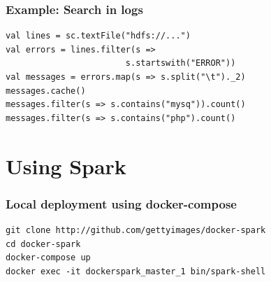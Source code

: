 \documentclass{beamer}
\begin{document}
\begin{frame}[fragile]
\frametitle{Example: Search in logs}
\begin{lstlisting}
val lines = sc.textFile("hdfs://...")
val errors = lines.filter(s =>
                        s.startswith("ERROR"))
val messages = errors.map(s => s.split("\t")._2)
messages.cache()
messages.filter(s => s.contains("mysq")).count()
messages.filter(s => s.contains("php").count()
\end{lstlisting}
\end{frame}




\section{Using Spark}

\begin{frame}[fragile]
  \frametitle{Local deployment using docker-compose}
  
  \center
{  \Large
{}
  
}
\vfill

  \begin{lstlisting}[basicstyle=\ttfamily,linebackgroundcolor={
      \btLstHL<1>{1}%
      \btLstHL<2>{2}%
      \btLstHL<3>{3}%
      \btLstHL<4>{4}%
    }]
git clone http://github.com/gettyimages/docker-spark
cd docker-spark
docker-compose up
docker exec -it dockerspark_master_1 bin/spark-shell 
\end{lstlisting}

\end{frame}
\end{document}
